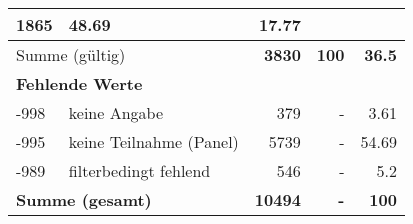 \begin{longtable}{lXrrr}
       \num{1865} &
       \num[round-mode=places,round-precision=2]{48.69} &
         \num[round-mode=places,round-precision=2]{17.77} \\
     \midrule
     \multicolumn{2}{l}{Summe (gültig)} &
       \textbf{\num{3830}} &
     \textbf{\num{100}} &
       \textbf{\num[round-mode=places,round-precision=2]{36.5}} \\
     \multicolumn{5}{l}{\textbf{Fehlende Werte}}\\
       -998 &
       keine Angabe &
         \num{379} &
        - &
         \num[round-mode=places,round-precision=2]{3.61} \\
       -995 &
       keine Teilnahme (Panel) &
         \num{5739} &
        - &
         \num[round-mode=places,round-precision=2]{54.69} \\
       -989 &
       filterbedingt fehlend &
         \num{546} &
        - &
         \num[round-mode=places,round-precision=2]{5.2} \\
     \midrule
     \multicolumn{2}{l}{\textbf{Summe (gesamt)}} &
          \textbf{\num{10494}} &
        \textbf{-} &
        \textbf{\num{100}} \\
     \bottomrule
     \end{longtable}
     
